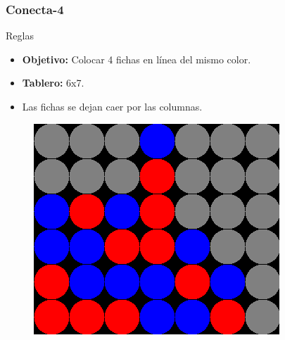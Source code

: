 \documentclass[10pt]{beamer}
\begin{document}
\begin{frame}[t]
\frametitle{Conecta-4}
\begin{block}{Reglas}
{\small
\begin{itemize}
\item \textbf{Objetivo:}
Colocar 4 fichas en línea del mismo color. %
\item \textbf{Tablero:} 6x7.
\item Las fichas se dejan caer por las columnas.
\end{itemize}
}
\end{block}

\begin{figure}[t]
\centering
\includegraphics[scale=0.4]{imagenes/conecta4.png}
\label{fig:conecta4_aplicacion}
\end{figure}
			
\end{frame}
\end{document}
